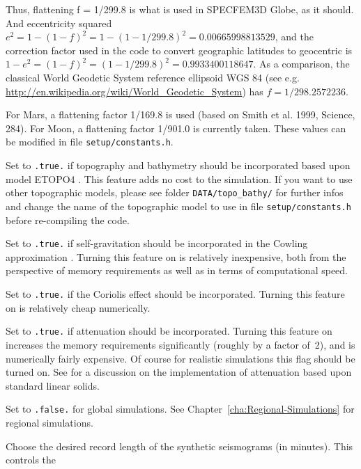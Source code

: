\begin{description}
Thus, flattening f = 1/299.8 is what is used in SPECFEM3D Globe, as it should. And eccentricity squared $e^2 = 1 - (1-f)^2 = 1 - (1 - 1/299.8)^2 = 0.00665998813529$, and the correction factor used in the code to convert geographic latitudes to geocentric is $1 - e^2 = (1-f)^2 = (1 - 1/299.8)^2 = 0.9933400118647$.
%
As a comparison, the classical World Geodetic System reference ellipsoid WGS 84 (see e.g. \url{http://en.wikipedia.org/wiki/World_Geodetic_System}) has $f = 1/298.2572236$.

For Mars, a flattening factor 1/169.8 is used (based on Smith et al. 1999, Science, 284). For Moon, a flattening factor 1/901.0 is currently taken. These values can be modified in file \texttt{setup/constants.h}.

%
\item [{\texttt{TOPOGRAPHY}}] Set to \texttt{.true.} if topography and
bathymetry should be incorporated based upon model ETOPO4 \citep{Etopo5}.
This feature adds no cost to the simulation.
If you want to use other topographic models, please see folder \texttt{DATA/topo\_bathy/} for further infos and change the name of the topographic model to use in file \texttt{setup/constants.h} before re-compiling the code.
%
\item [{\texttt{GRAVITY}}] Set to \texttt{.true.} if self-gravitation should
be incorporated in the Cowling approximation \citep{KoTr02b,DaTr98}.
Turning this feature on is relatively inexpensive, both from the perspective
of memory requirements as well as in terms of computational speed.
%
\item [{\texttt{ROTATION}}] Set to \texttt{.true.} if the Coriolis effect
should be incorporated. Turning this feature on is relatively cheap
numerically.
%
\item [{\texttt{ATTENUATION}}] Set to \texttt{.true.} if attenuation should
be incorporated. Turning this feature on increases the memory requirements
significantly (roughly by a factor of~2), and is numerically fairly
expensive. Of course for realistic simulations this flag should be
turned on. See \citet{KoTr99,KoTr02a} for a discussion on the implementation
of attenuation based upon standard linear solids.
%
\item [{\texttt{ABSORBING\_CONDITIONS}}] Set to \texttt{.false.} for global
simulations. See Chapter~\ref{cha:Regional-Simulations} for regional
simulations.
%
\item [{\texttt{RECORD\_LENGTH\_IN\_MINUTES}}] Choose the desired record
length of the synthetic seismograms (in minutes). This controls the

\end{description}
